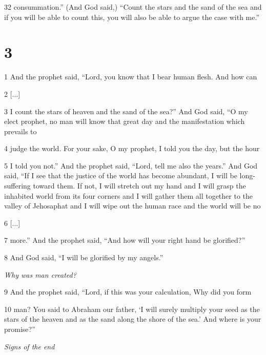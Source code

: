 \par 32 consummation.” (And God said,) “Count the stars and the sand of the sea and if you will be able to count this, you will also be able to argue the case with me.”

\chapter{3}

\par 1 And the prophet said, “Lord, you know that I bear human flesh. And how can

\par 2 [...]

\par 3 I count the stars of heaven and the sand of the sea?” And God said, “O my elect prophet, no man will know that great day and the manifestation which prevails to

\par 4 judge the world. For your sake, O my prophet, I told you the day, but the hour

\par 5 I told you not.” And the prophet said, “Lord, tell me also the years.” And God said, “If I see that the justice of the world has become abundant, I will be long-suffering toward them. If not, I will stretch out my hand and I will grasp the inhabited world from its four corners and I will gather them all together to the valley of Jehosaphat and I will wipe out the human race and the world will be no

\par 6 [...]

\par 7 more.” And the prophet said, “And how will your right hand be glorified?”

\par 8 And God said, “I will be glorified by my angels.”

\par \textit{Why was man created?}

\par 9 And the prophet said, “Lord, if this was your calculation, Why did you form

\par 10 man? You said to Abraham our father, ‘I will surely multiply your seed as the stars of the heaven and as the sand along the shore of the sea.’ And where is your promise?”

\par \textit{Signs of the end}

